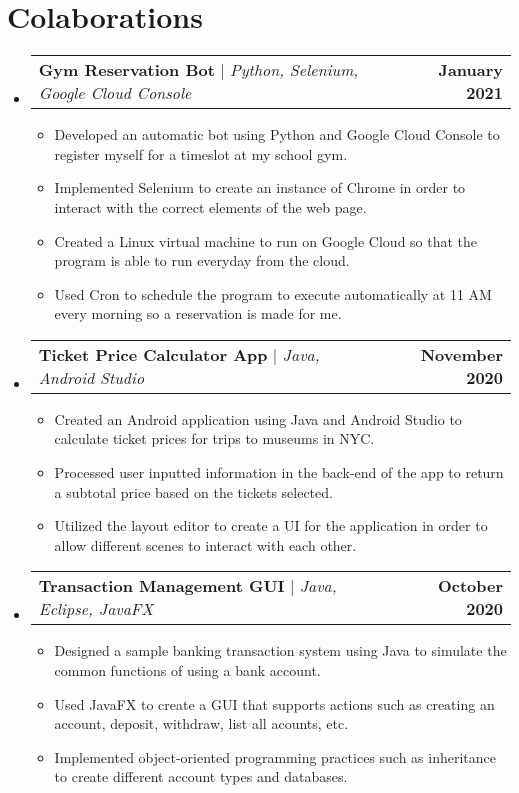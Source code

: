 \documentclass[letterpaper,11pt]{article}
\makeatletter
\newcommand{\resumeItem}[1]{
  \item\small{
    {#1 \vspace{-2pt}}
  }
}
\newcommand{\resumeProjectHeading}[2]{
    \item
    \begin{tabular*}{1.001\textwidth}{l@{\extracolsep{\fill}}r}
      \small#1 & \textbf{\small #2}\\
    \end{tabular*}\vspace{-7pt}
}
\newcommand{\resumeSubHeadingListStart}{\begin{itemize}[leftmargin=0.0in, label={}]}
\newcommand{\resumeSubHeadingListEnd}{\end{itemize}}
\newcommand{\resumeItemListStart}{\begin{itemize}}
\newcommand{\resumeItemListEnd}{\end{itemize}\vspace{-5pt}}
\makeatother
\begin{document}
\section{Colaborations}
    \nocite{*}
    \begingroup
    \renewcommand{\section}[2]{}%
    
    
    \endgroup

















    
    \resumeSubHeadingListStart
      \resumeProjectHeading
          {\textbf{Gym Reservation Bot} $|$ \emph{Python, Selenium, Google Cloud Console}}{January 2021}
          \resumeItemListStart
            \resumeItem{Developed an automatic bot using Python and Google Cloud Console to register myself for a timeslot at my school gym.}
            \resumeItem{Implemented Selenium to create an instance of Chrome in order to interact with the correct elements of the web page.}
            \resumeItem{Created a Linux virtual machine to run on Google Cloud so that the program is able to run everyday from the cloud.}
            \resumeItem{Used Cron to schedule the program to execute automatically at 11 AM every morning so a reservation is made for me.}
          \resumeItemListEnd
          \vspace{-13pt}
      \resumeProjectHeading
          {\textbf{Ticket Price Calculator App} $|$ \emph{Java, Android Studio}}{November 2020}
          \resumeItemListStart
            \resumeItem{Created an Android application using Java and Android Studio to calculate ticket prices for trips to museums in NYC.}
            \resumeItem{Processed user inputted information in the back-end of the app to return a subtotal price based on the tickets selected.}
            \resumeItem{Utilized the layout editor to create a UI for the application in order to allow different scenes to interact with each other.}
          \resumeItemListEnd 
          \vspace{-13pt}
          \resumeProjectHeading
          {\textbf{Transaction Management GUI} $|$ \emph{Java, Eclipse, JavaFX}}{October 2020}
          \resumeItemListStart
            \resumeItem{Designed a sample banking transaction system using Java to simulate the common functions of using a bank account.}
            \resumeItem{Used JavaFX to create a GUI that supports actions such as creating an account, deposit, withdraw, list all acounts, etc.}
            \resumeItem{Implemented object-oriented programming practices such as inheritance to create different account types and databases.}
          \resumeItemListEnd 
    \resumeSubHeadingListEnd
\vspace{-15pt}
\end{document}
